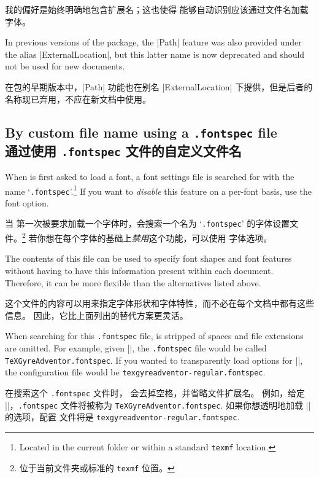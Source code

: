 \documentclass[a4paper]{l3doc}
\begin{document}
我的偏好是始终明确地包含扩展名；这也使得  能够自动识别应该通过文件名加载字体。

In previous versions of the package, the |Path| feature was also provided under the alias |ExternalLocation|, but this latter name is now deprecated and should not be used for new documents.

在包的早期版本中，|Path| 功能也在别名 |ExternalLocation| 下提供，但是后者的名称现已弃用，不应在新文档中使用。

\subsection{By custom file name using a \texttt{.fontspec} file\\通过使用 \texttt{.fontspec} 文件的自定义文件名}
\label{sec:fontspecfile}

When  is first asked to load a font, a font settings file is searched
for with the name `\texttt{.fontspec}'.\footnote{Located in the current folder or within a standard \texttt{texmf} location.}
If you want to \emph{disable} this feature on a per-font basis, use the  font option.

当  第一次被要求加载一个字体时，会搜索一个名为 `\texttt{.fontspec}' 的字体设置文件。\footnote{位于当前文件夹或标准的 \texttt{texmf} 位置。} 若你想在每个字体的基础上\emph {禁用}这个功能，可以使用  字体选项。

The contents of this file can be used to specify font shapes and font features without having to have this information present within each document.
Therefore, it can be more flexible than the alternatives listed above.

这个文件的内容可以用来指定字体形状和字体特性，而不必在每个文档中都有这些信息。 因此，它比上面列出的替代方案更灵活。

When searching for this \texttt{.fontspec} file,  is stripped of spaces and file extensions are omitted.
For example, given |\setmainfont{TeX Gyre Adventor}|, the \texttt{.fontspec} file would be
called \texttt{TeXGyreAdventor.fontspec}.
If you wanted to transparently load options for |\setmainfont{texgyreadventor-regular.otf}|, the configuration
file would be \texttt{texgyreadventor-regular.fontspec}.

在搜索这个 \texttt {.fontspec} 文件时， 会去掉空格，并省略文件扩展名。 例如，给定 |\setmainfont {TeX Gyre Adventor}|，\texttt {.fontspec} 文件将被称为 \texttt {TeXGyreAdventor.fontspec}. 如果你想透明地加载 |\setmainfont {texgyreadventor-regular.otf}| 的选项，配置 文件将是 \texttt {texgyreadventor-regular.fontspec}.
\end{document}
